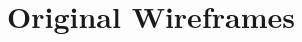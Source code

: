\documentclass[12pt,a4paper,twoside,openright]{book}
\begin{document}
\label{appendix_participant_consent_form}
\chapter{Original Wireframes}
\label{appendix_wireframes}
\end{document}
